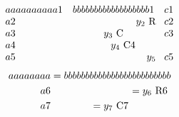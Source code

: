 \documentclass{article}
\begin{document}
\[\begin{array}{lll}
aaaaaaaaaa1 & bbbbbbbbbbbbbbbbbb1 & c1 \\
a2 & \omit\hfill $y_2$ R & c2 \\
a3 & \omit\hfil $y_3$ C\hfil & c3 \\
a4 & \multispan2\hfil $y_4$ C4\hfil \\
a5 & \omit{\hfill $y_5$} & c5
\end{array}\]
\begin{equation}\begin{aligned}
aaaaaaaa &= bbbbbbbbbbbbbbbbbbbbbbbbb \\
a6 & \omit\hfill $=y_6$ R6 \\
a7 & \omit\hfil $=y_7$ C7\hfil
\end{aligned}\end{equation}
\end{document}
